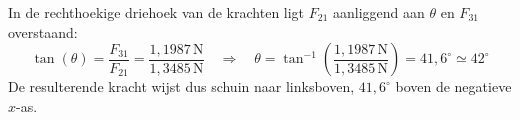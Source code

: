 \documentclass{ximera}
\begin{document}
\begin{exercise}
\begin{question}
        \begin{solution}\nl
            In de rechthoekige driehoek van de krachten ligt $F_{21}$ aanliggend aan $\theta$ en $F_{31}$ overstaand:
            \[
                \tan(\theta) = \frac{F_{31}}{F_{21}} = \frac{1{,}1987 \, \mathrm{N}}{1{,}3485 \, \mathrm{N}}
                \quad\Rightarrow\quad \theta = \tan^{-1}\left(\frac{1{,}1987 \, \mathrm{N}}{1{,}3485 \, \mathrm{N}}\right) = 41{,}6^\circ \simeq \boxed{42^\circ}
            \]
            De resulterende kracht wijst dus schuin naar linksboven, $41{,}6^\circ$ boven de negatieve $x$-as.
        \end{solution}
    \end{question}
\end{exercise}

\end{document}
